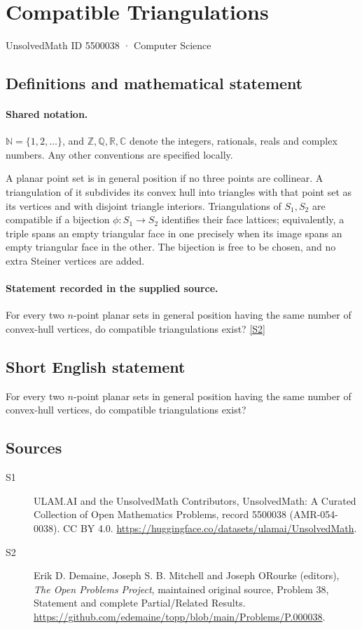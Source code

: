 \documentclass[11pt]{article}
\newcommand{\sref}[2]{\hyperlink{source:#1:#2}{[S#2]}}
\begin{document}
\setcounter{section}{5500037}
\section{Compatible Triangulations}\label{5500038}
{\small\sffamily UnsolvedMath ID 5500038 · Computer Science}
\subsection{Definitions and mathematical statement}

\paragraph{Shared notation.}$\mathbb N=\{1,2,\ldots\}$, and $\mathbb Z,\mathbb Q,\mathbb R,\mathbb C$ denote the integers, rationals, reals and complex numbers. Any other conventions are specified locally.


A planar point set is in general position if no three points are collinear. A triangulation of it subdivides its convex hull into triangles with that point set as its vertices and with disjoint triangle interiors. Triangulations of $S_1,S_2$ are compatible if a bijection $\phi:S_1\to S_2$ identifies their face lattices; equivalently, a triple spans an empty triangular face in one precisely when its image spans an empty triangular face in the other. The bijection is free to be chosen, and no extra Steiner vertices are added.
\paragraph{Statement recorded in the supplied source.}
For every two $n$-point planar sets in general position having the same number of convex-hull vertices, do compatible triangulations exist? \sref{5500038}{2}
\subsection{Short English statement}
For every two $n$-point planar sets in general position having the same number of convex-hull vertices, do compatible triangulations exist?
\subsection{Sources}
\begin{description}
\item[\hypertarget{source:5500038:1}{S1}] ULAM.AI and the UnsolvedMath Contributors, UnsolvedMath: A Curated Collection of Open Mathematics Problems, record 5500038 (AMR-054-0038). CC BY 4.0. \url{https://huggingface.co/datasets/ulamai/UnsolvedMath}.
\item[\hypertarget{source:5500038:2}{S2}] Erik D. Demaine, Joseph S. B. Mitchell and Joseph O\textquotesingle Rourke (editors), \emph{The Open Problems Project}, maintained original source, Problem 38, Statement and complete Partial/Related Results. \url{https://github.com/edemaine/topp/blob/main/Problems/P.000038}.
\end{description}
\label{end:5500038}
\end{document}
